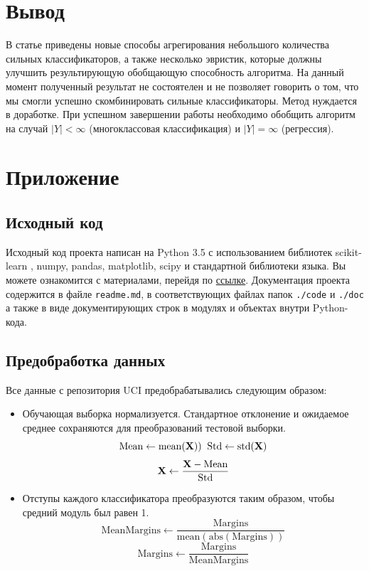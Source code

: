\documentclass[12pt,twoside]{article}
\newcommand{\lto}{\leftarrow}
\theoremstyle{plain}
\theoremstyle{remark}
\theoremstyle{definition}
\begin{document}
\newpage

\section{Вывод}

В статье приведены новые способы агрегирования небольшого количества сильных классификаторов, а также несколько эвристик, которые должны улучшить результирующую обобщающую способность алгоритма. На данный момент полученный результат не состоятелен и не позволяет говорить о том, что мы смогли успешно скомбинировать сильные классификаторы. Метод нуждается в доработке. При успешном завершении работы необходимо обобщить алгоритм на случай $|Y| < \infty$ (многоклассовая классификация) и $|Y| = \infty$ (регрессия).

\section{Приложение}

\subsection{Исходный код}

Исходный код проекта написан на Python 3.5 с использованием библиотек scikit-learn \cite{scikit-learn}, numpy, pandas, matplotlib, scipy и стандартной библиотеки языка. Вы можете ознакомится с материалами, перейдя по \href{https://sourceforge.net/p/mlalgorithms/code/HEAD/tree/Group374/Ivanychev2016SVM_Multimodelling/}{ссылке}. Документация проекта содержится в файле \texttt{readme.md}, в соответствующих файлах папок \texttt{./code} и \texttt{./doc} а также в виде документирующих строк в модулях и объектах внутри Python-кода.

\subsection{Предобработка данных}

Все данные с репозитория UCI предобрабатывались следующим образом:

\begin{itemize}
	\item Обучающая выборка нормализуется. Стандартное отклонение и ожидаемое среднее сохраняются для преобразований тестовой выборки.
$$
		\mathrm{Mean} \lto \mathrm{mean}(\v{X}))\;\; \mathrm{Std} \lto \mathrm{std}(\v{X})
$$
$$
		\v{X} \lto \frac{\v{X} - \mathrm{Mean}}{\mathrm{Std}}
$$
	\item Отступы каждого классификатора преобразуются таким образом, чтобы средний модуль был равен 1.
			$$
			\mathrm{MeanMargins} \lto \frac{\mathrm{Margins}}{\mathrm{mean}(\mathrm{abs}(\mathrm{Margins}))}
			$$
			$$
			\mathrm{Margins} \lto \frac{\mathrm{Margins}}{\mathrm{MeanMargins}}
			$$
\end{itemize} 
\end{document}
